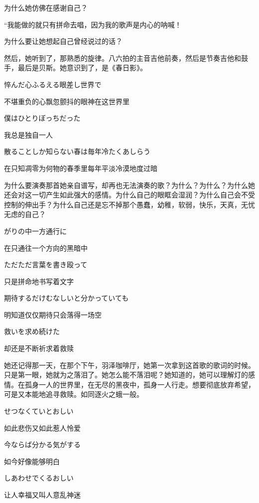 \documentclass{article}
\begin{document}
为什么她仿佛在感谢自己？



“我能做的就只有拼命去唱，因为我的歌声是内心的呐喊！



为什么要让她想起自己曾经说过的话？



然后，她听到了，那熟悉的旋律。八六拍的主音吉他前奏，然后是节奏吉他和鼓手，最后是贝斯。她意识到了，是《春日影》。



悴んだ心ふるえる眼差し世界で

不堪重负的心飘忽颤抖的眼神在这世界里

僕はひとりぼっちだった

我总是独自一人

散ることしか知らない春は毎年冷たくあしらう

在只知凋零为何物的春季里每年平淡冷漠地度过暗



为什么要演奏那首她亲自谱写，却再也无法演奏的歌？为什么？为什么？为什么她还会对这一切产生如此强大的感情。为什么自己的眼眶会湿润？为什么自己会不受控制的伸出手？为什么自己还是忘不掉那个愚蠢，幼稚，软弱，快乐，天真，无忧无虑的自己？



がりの中一方通行に

在只通往一个方向的黑暗中

ただただ言葉を書き殴って

只是拼命地书写着文字

期待するだけむなしいと分かっていても

明知道仅仅期待只会落得一场空

救いを求め続けた

却还是不断祈求着救赎



她还记得那一天，在那个下午，羽泽咖啡厅，她第一次拿到这首歌的歌词的时候。只是第一眼，她就为之落泪了。她怎么能不落泪呢？她知道的，她可以理解灯的感情。在孤身一人的世界里，在无尽的黑夜中，孤身一人行走。想要彻底放弃希望，可是又本能地追寻救赎。如同逐火之蛾一般。



せつなくていとおしい

如此悲伤又如此惹人怜爱

今ならば分かる気がする

如今好像能够明白

しあわせでくるおしい

让人幸福又叫人意乱神迷
\end{document}
